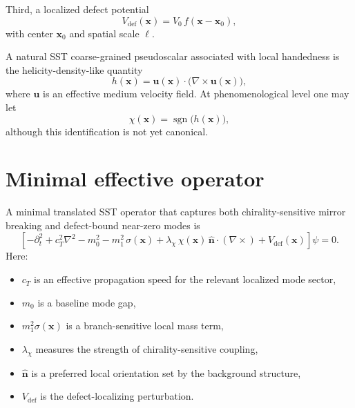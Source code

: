 \documentclass[11pt]{article}
\begin{document}
        Third, a localized defect potential
        \begin{equation}
            V_{\mathrm{def}}(\mathbf{x}) = V_0\,f(\mathbf{x}-\mathbf{x}_0),
        \end{equation}
        with center $\mathbf{x}_0$ and spatial scale $\ell$.

        A natural SST coarse-grained pseudoscalar associated with local handedness is the helicity-density-like quantity
        \begin{equation}
            h(\mathbf{x}) = \mathbf{u}(\mathbf{x})\cdot\bigl(\nabla\times \mathbf{u}(\mathbf{x})\bigr),
        \end{equation}
        where $\mathbf{u}$ is an effective medium velocity field. At phenomenological level one may let
        \begin{equation}
            \chi(\mathbf{x}) = \operatorname{sgn}\!\bigl(h(\mathbf{x})\bigr),
        \end{equation}
        although this identification is not yet canonical.

    \section{Minimal effective operator}
        A minimal translated SST operator that captures both chirality-sensitive mirror breaking and defect-bound near-zero modes is
        \begin{equation}
            \left[
                -\partial_t^2
            + c_T^2 \nabla^2
            - m_0^2
            - m_1^2 \, \sigma(\mathbf{x})
                + \lambda_\chi \, \chi(\mathbf{x})\, \hat{\mathbf{n}}\cdot(\nabla\times)
                + V_{\mathrm{def}}(\mathbf{x})
            \right]\psi = 0.
            \label{eq:min-op}
        \end{equation}
        Here:
        \begin{itemize}
            \item $c_T$ is an effective propagation speed for the relevant localized mode sector,
            \item $m_0$ is a baseline mode gap,
            \item $m_1^2\sigma(\mathbf{x})$ is a branch-sensitive local mass term,
            \item $\lambda_\chi$ measures the strength of chirality-sensitive coupling,
            \item $\hat{\mathbf{n}}$ is a preferred local orientation set by the background structure,
            \item $V_{\mathrm{def}}$ is the defect-localizing perturbation.
        \end{itemize}
\end{document}
